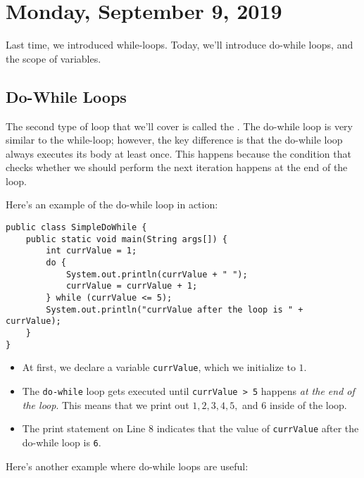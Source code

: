 \section{Monday, September 9, 2019}

Last time, we introduced while-loops. Today, we'll introduce do-while loops, and the scope of variables.


\iffalse
\subsection{Random Numbers}
\fi

\subsection{Do-While Loops}

The second type of loop that we'll cover is called the . The do-while loop is very similar to the while-loop; however, the key difference is that the do-while loop always executes its body at least once. This happens because the condition that checks whether we should perform the next iteration happens at the end of the loop. 

Here's an example of the do-while loop in action:

\begin{lstlisting}
public class SimpleDoWhile {
    public static void main(String args[]) {
        int currValue = 1;
        do {
            System.out.println(currValue + " ");
            currValue = currValue + 1;
        } while (currValue <= 5);
        System.out.println("currValue after the loop is " + currValue);
    }
}
\end{lstlisting}

\begin{itemize}
    \item At first, we declare a variable \verb!currValue!, which we initialize to $1$. 
    \item The \verb!do-while! loop gets executed until \verb!currValue > 5! happens \textit{at the end of the loop}. This means that we print out $1, 2, 3, 4, 5,$ and $6$ inside of the loop. 
    \item The print statement on Line $8$ indicates that the value of \verb!currValue! after the do-while loop is \verb!6!. 
\end{itemize}



Here's another example where do-while loops are useful: 


